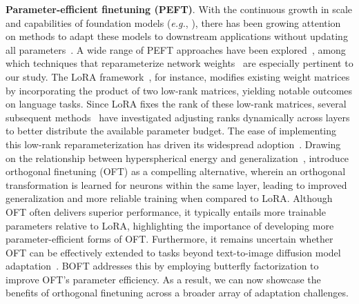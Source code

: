 \textbf{Parameter-efficient finetuning (PEFT)}. With the continuous growth in scale and capabilities of foundation models (\emph{e.g.}, \cite{brown2020language,radford2021learning,rombach2022high,kirillov2023segment}), there has been growing attention on methods to adapt these models to downstream applications without updating all parameters~\cite{treviso2023efficient,ding2023parameter,lialin2023scaling}. A wide range of PEFT approaches have been explored~\cite{houlsby2019parameter,aghajanyan2020intrinsic,hulora2022,edalati2022krona,wang2022adamix,gheini2021cross,zaken2022bitfit,guo2020parameter,sung2021training,ansell2022composable,lester2021power,li2021prefix,vu2022spot,he2021towards,mao2021unipelt,karimi2021compacter,liu2022few,sung2022lst,chen2022parameter,jia2022visual,chen2022adaptformer,zhang2022neural,jie2023fact,lian2022scaling,luo2023towards}, among which techniques that reparameterize network weights~\cite{aghajanyan2020intrinsic,hulora2022,edalati2022krona} are especially pertinent to our study. The LoRA framework~\cite{hulora2022}, for instance, modifies existing weight matrices by incorporating the product of two low-rank matrices, yielding notable outcomes on language tasks. Since LoRA fixes the rank of these low-rank matrices, several subsequent methods~\cite{zhang2022adaptive,valipour2022dylora,zhang2023increlora} have investigated adjusting ranks dynamically across layers to better distribute the available parameter budget. The ease of implementing this low-rank reparameterization has driven its widespread adoption~\cite{dettmers2023qlora,zi2023delta,chavan2023one}. Drawing on the relationship between hyperspherical energy and generalization~\cite{liu2018learning,liu2021orthogonal}, \cite{qiu2023controlling} introduce orthogonal finetuning (OFT) as a compelling alternative, wherein an orthogonal transformation is learned for neurons within the same layer, leading to improved generalization and more reliable training when compared to LoRA. Although OFT often delivers superior performance, it typically entails more trainable parameters relative to LoRA, highlighting the importance of developing more parameter-efficient forms of OFT. Furthermore, it remains uncertain whether OFT can be effectively extended to tasks beyond text-to-image diffusion model adaptation~\cite{qiu2023controlling}. BOFT addresses this by employing butterfly factorization to improve OFT's parameter efficiency. As a result, we can now showcase the benefits of orthogonal finetuning across a broader array of adaptation challenges.

